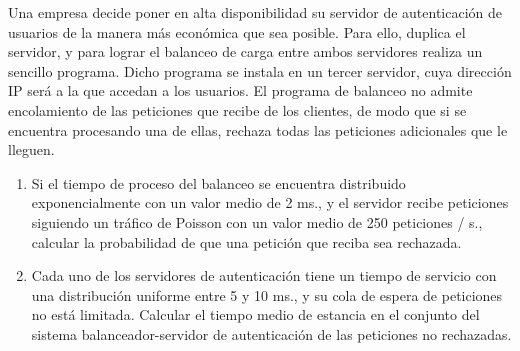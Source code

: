 \begin{problem}[28]
Una empresa decide poner en alta disponibilidad su servidor de autenticación de usuarios de la manera más económica que sea posible. Para ello, duplica el servidor, y para lograr el balanceo de carga entre ambos servidores realiza un sencillo programa. Dicho programa se instala en un tercer servidor, cuya dirección IP será a la que accedan a los usuarios. El programa de balanceo no admite encolamiento de las peticiones que recibe de los clientes, de modo que si se encuentra procesando una de ellas, rechaza todas las peticiones adicionales que le lleguen.
\begin{enumerate}
\item Si el tiempo de proceso del balanceo se encuentra distribuido exponencialmente con un valor medio de 2 ms., y el servidor recibe peticiones siguiendo un tráfico de Poisson con un valor medio de 250 peticiones / s., calcular la probabilidad de que una petición que reciba sea rechazada.
\item Cada uno de los servidores de autenticación tiene un tiempo de servicio con una distribución uniforme entre 5 y 10 ms., y su cola de espera de peticiones no está limitada. Calcular el tiempo medio de estancia en el conjunto del sistema balanceador-servidor de autenticación de las peticiones no rechazadas.
\end{enumerate}
\solution
\end{problem}
